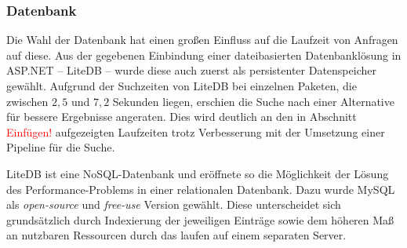 \subsubsection{Datenbank} \label{sec:ExperimenteDB}
    Die Wahl der Datenbank hat einen großen Einfluss auf die Laufzeit von Anfragen auf diese.
    Aus der gegebenen Einbindung einer dateibasierten Datenbanklösung in ASP.NET -- LiteDB -- wurde diese auch zuerst als persistenter Datenspeicher gewählt.
    Aufgrund der Suchzeiten von LiteDB bei einzelnen Paketen, die zwischen $2,5$ und $7,2$ Sekunden liegen, erschien die Suche nach einer Alternative für bessere Ergebnisse angeraten.
    Dies wird deutlich an den in Abschnitt \textcolor{red}{Einfügen!} aufgezeigten Laufzeiten trotz Verbesserung mit der Umsetzung einer Pipeline für die Suche.

    LiteDB ist eine NoSQL-Datenbank und eröffnete so die Möglichkeit der Lösung des Performance-Problems in einer relationalen Datenbank.
    Dazu wurde MySQL als \textit{open-source} und \textit{free-use} Version gewählt.
    Diese unterscheidet sich grundsätzlich durch Indexierung der jeweiligen Einträge sowie dem höheren Maß an nutzbaren Ressourcen durch das laufen auf einem separaten Server.
